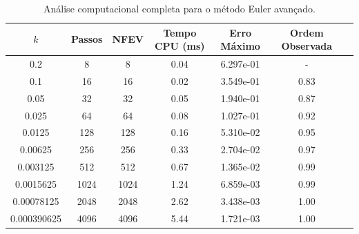 \begin{table}[H]
    \centering
    \begin{tabular}{ccccccc}
        \hline
        $k$ & Passos & NFEV & Tempo CPU (ms) & Erro Máximo & Ordem Observada \\
        \hline
        0.2 & 8 & 8 & 0.04  & 6.297e-01 & - \\
        0.1 & 16 & 16 & 0.02  & 3.549e-01 & 0.83 \\
        0.05 & 32 & 32 & 0.05  & 1.940e-01 & 0.87 \\
        0.025 & 64 & 64 & 0.08  & 1.027e-01 & 0.92 \\
        0.0125 & 128 & 128 & 0.16  & 5.310e-02 & 0.95 \\
        0.00625 & 256 & 256 & 0.33  & 2.704e-02 & 0.97 \\
        0.003125 & 512 & 512 & 0.67  & 1.365e-02 & 0.99 \\
        0.0015625 & 1024 & 1024 & 1.24  & 6.859e-03 & 0.99 \\
        0.00078125 & 2048 & 2048 & 2.62  & 3.438e-03 & 1.00 \\
        0.000390625 & 4096 & 4096 & 5.44  & 1.721e-03 & 1.00 \\
        \hline
    \end{tabular}
    \caption{Análise computacional completa para o método Euler avançado.}
    \label{tab:erros_euler_avancado}
\end{table}
